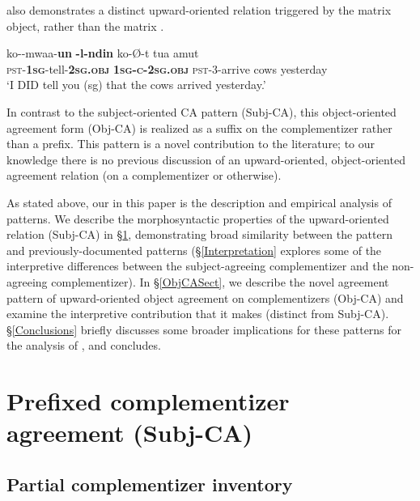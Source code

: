 \documentclass[output=paper,newtxmath,modfonts,nonflat,hidelinks]{langsci/langscibook}
\begin{document}
 also demonstrates a distinct upward-oriented  relation triggered by the matrix object, rather than the matrix .

\ea
\gll ko-\textbf{}-mwaa-\textbf{un} \textbf{-l\textepsilon{}-nd\textyogh{}in} ko-\O-\textsci{}t tua amut \\
\textsc{pst}-\textbf{1\textsc{sg}}-tell-\textbf{2\textsc{sg.obj}} \textbf{1\textsc{sg-c-}2\textsc{sg.obj}} \textsc{pst}-3-arrive cows yesterday \\
\glt `I DID tell you (sg) that the cows arrived yesterday.'
\z

In contrast to the subject-oriented CA pattern (Subj-CA), this object-oriented agreement form (Obj-CA) is realized as a suffix on the complementizer rather than a prefix. This pattern is a novel contribution to the literature; to our knowledge there is no previous discussion of an upward-oriented, object-oriented agreement relation (on a complementizer or otherwise). 

As stated above, our  in this paper is the  description and empirical analysis of   patterns. We describe the morphosyntactic properties of the upward-oriented   relation (Subj-CA) in \S \ref{sec:Diercks,Rao:2}, demonstrating broad similarity between the  pattern and previously-documented patterns (\S \ref{Interpretation} explores some of the interpretive differences between the subject-agreeing complementizer and the non-agreeing complementizer). In \S \ref{ObjCASect}, we describe the novel agreement pattern of upward-oriented object agreement on complementizers (Obj-CA) and examine the interpretive contribution that it makes (distinct from Subj-CA). \S \ref{Conclusions} briefly discusses some broader implications for these patterns for the analysis of , and concludes.


\section{Prefixed complementizer agreement (Subj-CA)} \label{sec:Diercks,Rao:2}

\subsection{Partial complementizer inventory}
\end{document}
